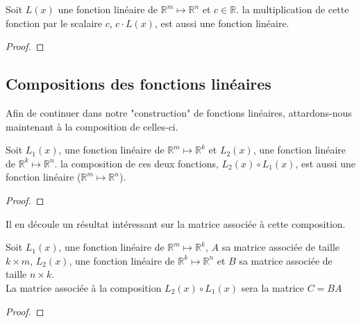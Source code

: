 \documentclass[12pt]{report}
\let\Bbb\mathbb
\theoremstyle{definition}
\begin{document}
    \begin{prop}
        \label{thm:multiplication_scalaire}
        Soit $L(x)$ une fonction linéaire de $\Bbb R^m \mapsto \Bbb R^n$  et $c \in \Bbb R$.
        la multiplication de cette fonction par le scalaire $c$, $c \cdot L(x)$, est aussi une fonction linéaire.
    \end{prop}
    \begin{proof}
    \end{proof}

    \subsection{Compositions des fonctions linéaires}
    Afin de continuer dans notre "construction" de fonctions linéaires, attardons-nous
    maintenant à la composition de celles-ci.
    \begin{prop}
        \label{thm:composition_fonction_lineaire}
        Soit $L_1(x)$, une fonction linéaire de $\Bbb R^m \mapsto \Bbb R^k$ et $L_2(x)$, une fonction linéaire de $\Bbb R^k \mapsto \Bbb R^n$.
        la composition de ces deux fonctions, $L_2(x) \circ L_1(x)$, est aussi une fonction linéaire ($\Bbb R^m \mapsto \Bbb R^n$).
    \end{prop}
    \begin{proof}
    \end{proof}
    Il en découle un résultat intéressant sur la matrice associée à cette composition.
    \begin{prop}
        \label{thm:composition_matrices_associes}
        Soit $L_1(x)$, une fonction linéaire de $\Bbb R^m \mapsto \Bbb R^k$, $A$ sa matrice associée de taille $k \times m$,
         $L_2(x)$, une fonction linéaire de $\Bbb R^k \mapsto \Bbb R^n$ et $B$ sa matrice associée de taille $n \times k$.
         \\
         La matrice associée à la composition $L_2(x) \circ L_1(x)$ sera la matrice $C = BA$
    \end{prop}
    \begin{proof}
    \end{proof}
\end{document}
